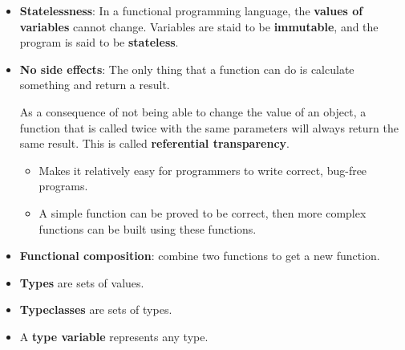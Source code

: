 \begin{itemize}
    \item \textbf{Statelessness}: In a functional programming language, the \textbf{values of variables} cannot change. Variables are staid to be \textbf{immutable}, and the program is said to be \textbf{stateless}.
    \item \textbf{No side effects}: The only thing that a function can do is calculate something and return a result.

        As a consequence of not being able to change the value of an object, a function that is called twice with the same parameters will always return the same result. This is called \textbf{referential transparency}.
        \begin{itemize}
            \item Makes it relatively easy for programmers to write correct, bug-free programs.
            \item A simple function can be proved to be correct, then more complex functions can be built using these functions.
        \end{itemize}
\end{itemize}

\begin{itemize}
    \item \textbf{Functional composition}: combine two functions to get a new function.
    \item \textbf{Types} are sets of values.
    \item \textbf{Typeclasses} are sets of types.
    \item A \textbf{type variable} represents any type.
\end{itemize}
